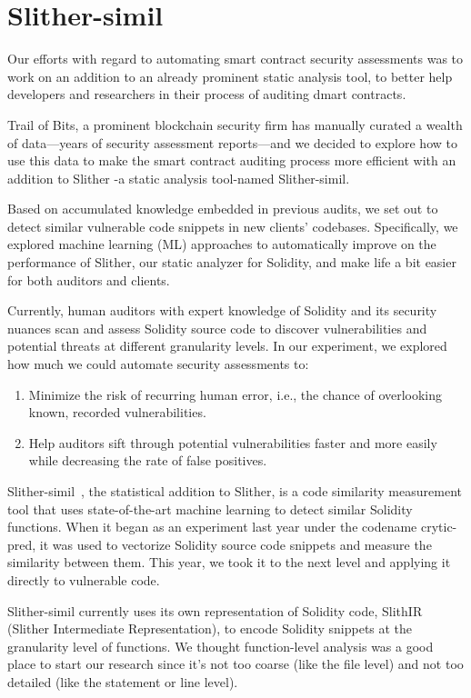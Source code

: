 \section{Slither-simil}
Our efforts with regard to automating smart contract security assessments was to work on an addition to an already prominent static analysis tool, to better help developers and researchers in their process of auditing dmart contracts.

Trail of Bits, a prominent blockchain security firm has manually curated a wealth of data—years of security assessment reports—and we decided to explore how to use this data to make the smart contract auditing process more efficient with an addition to Slither -a static analysis tool-named Slither-simil.

Based on accumulated knowledge embedded in previous audits, we set out to detect similar vulnerable code snippets in new clients' codebases. Specifically, we explored machine learning (ML) approaches to automatically improve on the performance of Slither, our static analyzer for Solidity, and make life a bit easier for both auditors and clients.

Currently, human auditors with expert knowledge of Solidity and its security nuances scan and assess Solidity source code to discover vulnerabilities and potential threats at different granularity levels.
In our experiment, we explored how much we could automate security assessments to:
\begin{enumerate}
  \item Minimize the risk of recurring human error, i.e., the chance of overlooking known, recorded vulnerabilities.
  \item Help auditors sift through potential vulnerabilities faster and more easily while decreasing the rate of false positives.
\end{enumerate}

Slither-simil~\cite{slithersimil}, the statistical addition to Slither, is a code similarity measurement tool that uses state-of-the-art machine learning to detect similar Solidity functions.
When it began as an experiment last year under the codename crytic-pred, it was used to vectorize Solidity source code snippets and measure the similarity between them.
This year, we took it to the next level and applying it directly to vulnerable code.

Slither-simil currently uses its own representation of Solidity code, SlithIR (Slither Intermediate Representation), to encode Solidity snippets at the granularity level of functions.
We thought function-level analysis was a good place to start our research since it's not too coarse (like the file level) and not too detailed (like the statement or line level).

